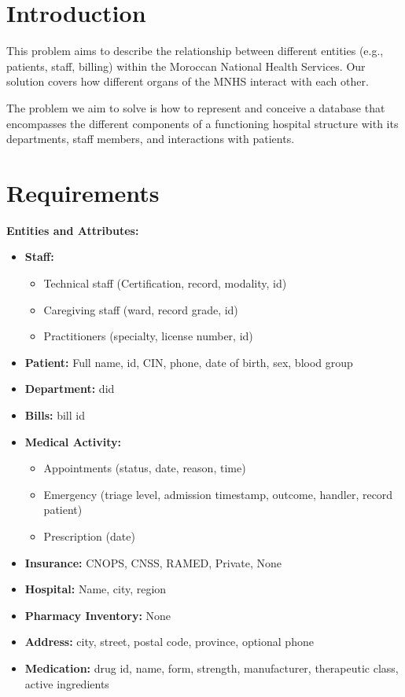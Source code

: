 \documentclass[a4paper,12pt]{article}
\begin{document}
\section{Introduction}
This problem aims to describe the relationship between different entities (e.g., patients, staff, billing) within the Moroccan National Health Services.  
Our solution covers how different organs of the MNHS interact with each other.

The problem we aim to solve is how to represent and conceive a database that encompasses the different components of a functioning hospital structure with its departments, staff members, and interactions with patients.

\section{Requirements}
\textbf{Entities and Attributes:}
\begin{itemize}
    \item \textbf{Staff:} 
    \begin{itemize}
        \item Technical staff (Certification, record, modality, id)
        \item Caregiving staff (ward, record grade, id)
        \item Practitioners (specialty, license number, id)
    \end{itemize}
    \item \textbf{Patient:} Full name, id, CIN, phone, date of birth, sex, blood group
    \item \textbf{Department:} did
    \item \textbf{Bills:} bill id
    \item \textbf{Medical Activity:} 
    \begin{itemize}
        \item Appointments (status, date, reason, time)
        \item Emergency (triage level, admission timestamp, outcome, handler, record patient)
        \item Prescription (date)
    \end{itemize}
    \item \textbf{Insurance:} CNOPS, CNSS, RAMED, Private, None
    \item \textbf{Hospital:} Name, city, region
    \item \textbf{Pharmacy Inventory:} None
    \item \textbf{Address:} city, street, postal code, province, optional phone
    \item \textbf{Medication:} drug id, name, form, strength, manufacturer, therapeutic class, active ingredients
\end{itemize}
\end{document}
